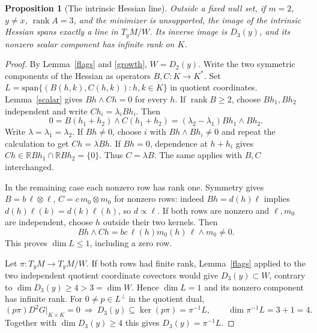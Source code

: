 \documentclass[11pt,letterpaper]{article}
\newtheorem{proposition}[theorem]{Proposition}
\newcommand{\R}{\mathbb R}
\newcommand{\rank}{\operatorname{rank}}
\begin{document}
\begin{proposition}[The intrinsic Hessian line]\label{line}
Outside a fixed null set, if $m=2$, $y\ne x$, $\rank A=3$, and the minimizer
is unsupported, the image of the intrinsic Hessian spans exactly a line
in $T_yM/W$. Its inverse image is $D_3(y)$, and its nonzero scalar component
has infinite rank on $K$.
\end{proposition}
\begin{proof}
By Lemma~\ref{flags} and \eqref{growth}, $W=D_2(y)$. Write the two
symmetric components of the Hessian as operators $B,C:K\to K^*$.
Set $L=\mathrm{span}\{(B(h,k),C(h,k)):h,k\in K\}$ in quotient coordinates.
Lemma~\ref{scalar} gives $Bh\wedge Ch=0$ for every $h$.
If $\rank B\ge2$, choose $Bh_1,Bh_2$ independent and write
$Ch_i=\lambda_i Bh_i$. Then
\[
 0=B(h_1+h_2)\wedge C(h_1+h_2)
   =(\lambda_2-\lambda_1)Bh_1\wedge Bh_2 .
\]
Write $\lambda=\lambda_1=\lambda_2$. If $Bh\ne0$, choose $i$ with
$Bh\wedge Bh_i\ne0$ and repeat the calculation to get $Ch=\lambda Bh$.
If $Bh=0$, dependence at $h+h_i$ gives
$Ch\in\R Bh_1\cap\R Bh_2=\{0\}$. Thus $C=\lambda B$.
The same applies with $B,C$ interchanged.

In the remaining case each nonzero row has rank one. Symmetry gives
$B=b\,\ell\otimes\ell$, $C=c\,m_0\otimes m_0$ for nonzero rows:
indeed $Bh=d(h)\ell$ implies $d(h)\ell(k)=d(k)\ell(h)$, so $d\propto\ell$.
If both rows are nonzero and $\ell,m_0$ are independent, choose $h$ outside
their two kernels. Then
\[
 Bh\wedge Ch=bc\,\ell(h)m_0(h)\,\ell\wedge m_0\ne0 .
\]
This proves $\dim L\le1$, including a zero row.

Let $\pi:T_yM\to T_yM/W$. If both rows had finite rank,
Lemma~\ref{flags} applied to the two independent quotient coordinate
covectors would give $D_3(y)\subset W$, contrary to
$\dim D_3(y)\ge4>3=\dim W$. Hence $\dim L=1$ and its nonzero
component has infinite rank. For $0\ne p\in L^\perp$ in the quotient dual,
\[
 (p\pi)D^2G|_{K\times K}=0
 \ \Longrightarrow\ D_3(y)\subseteq\ker(p\pi)=\pi^{-1}L,\qquad
 \dim\pi^{-1}L=3+1=4 .
\]
Together with $\dim D_3(y)\ge4$ this gives $D_3(y)=\pi^{-1}L$.
\end{proof}
\end{document}
